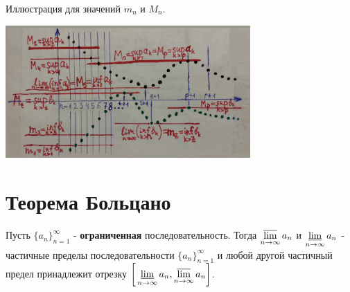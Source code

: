 	Иллюстрация для значений $m_n$ и $M_n$.
	\begin{center}
		\includegraphics[width=0.7\textwidth]{img/lecture5/inf_and_sup_examples}
	\end{center}
	
	\section{Теорема Больцано}
	
	\begin{theorem}
		Пусть $\{a_n\}^{\infty}_{n = 1}$ - \textbf{ограниченная} последовательность. Тогда $\displaystyle \operatorname*{\overline{lim}}_{n \to \infty} a_n$ и $\displaystyle \operatorname*{\underline{lim}}_{n \to \infty} a_n$ - частичные пределы последовательности $\{a_n\}^{\infty}_{n = 1}$ и любой другой частичный предел принадлежит отрезку $\displaystyle \bigg[\operatorname*{\underline{lim}}_{n \to \infty} a_n, \operatorname*{\overline{lim}}_{n \to \infty} a_n\bigg]$.
	\end{theorem}
	
